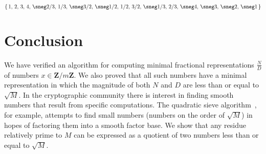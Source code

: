 \documentclass[submission,copyright,creativecommons]{eptcs}
\begin{document}
\[
\{
\,1,\,2,\,3,\,4,\,\sneg2/3,\,1/3,\,\sneg3/2,\,\sneg1/2,\,1/2,\,3/2,\,\sneg1/3,\,2/3,\,\sneg4,\,\sneg3,\,\sneg2,\,\sneg1\,
\}
\]

\section{Conclusion}

We have verified an algorithm for computing minimal fractional
representations $\frac{N}{D}$ of numbers $x \in
\mathbf{Z}/m\mathbf{Z}$.  We also proved that all such numbers have a
minimal representation in which the magnitude of both $N$ and $D$ are
less than or equal to $\sqrt{M}$.  In the cryptographic community
there is interest in finding smooth numbers that result from specific
computations.  The quadratic sieve algorithm~\cite{Sieve}, for
example, attempts to find small numbers (numbers on the order of
$\sqrt{M}$) in hopes of factoring them into a smooth factor base.  We
show that any residue relatively prime to $M$ can be expressed as a
quotient of two numbers less than or equal to $\sqrt{M}$.

{}

\end{document}
